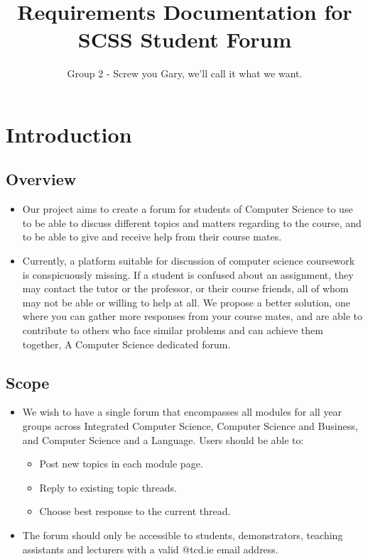 \documentclass[a4paper, 12pt]{article}
\begin{document}
\title{Requirements Documentation for SCSS Student Forum}
\author{Group 2 - Screw you Gary, we'll call it what we want.}
\maketitle
	\section{Introduction}
		\subsection{Overview}
			\begin{itemize}
				\item Our project aims to create a forum for students of 
				Computer Science to use to be able to discuss different topics 
				and matters regarding to the course, and to be able to give 
				and receive help from their course mates.
				\item Currently, a platform suitable for discussion 
				of computer science coursework is conspicuously missing. 
				If a student is confused about an assignment, they may 
				contact the tutor or the professor, or their course friends, 
				all of whom may not be able or willing to help at all. 
				We propose a better solution, one where you can gather more 
				responses from your course mates, and are able to contribute 
				to others who face similar problems and can achieve them 
				together, A Computer Science dedicated forum.
			\end{itemize}
		\subsection{Scope}
			\begin{itemize}
				\item We wish to have a single forum that encompasses all modules 
				for all year groups across Integrated Computer Science, Computer 
				Science and Business, and Computer Science and a Language. Users should be able to:
				\begin{itemize}
					
					\item Post new topics in each module page.
					\item Reply to existing topic threads.
					\item Choose best response to the current thread.
				\end{itemize}
				\item The forum should only be accessible to students, demonstrators, 
				teaching assistants and lecturers with a valid @tcd.ie email address.
			\end{itemize}
\end{document}
